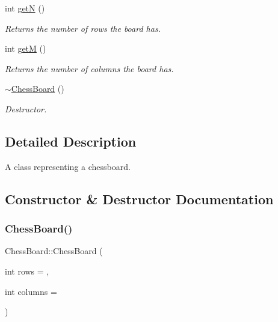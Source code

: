 \begin{DoxyCompactItemize}
$$int \mbox{\hyperlink{classChessBoard_acc60486a0fafa95c85263e15e6b7f6ab}{getN}} ()
\begin{DoxyCompactList}\small\item\em Returns the number of rows the board has. \end{DoxyCompactList}\item 
\mbox{\label{classChessBoard_a490cb74dc406003683738ab23372e66e}} 
int \mbox{\hyperlink{classChessBoard_a490cb74dc406003683738ab23372e66e}{getM}} ()
\begin{DoxyCompactList}\small\item\em Returns the number of columns the board has. \end{DoxyCompactList}\item 
\mbox{\label{classChessBoard_acece8633f444b90d7b371b57f52d0780}} 
\mbox{\hyperlink{classChessBoard_acece8633f444b90d7b371b57f52d0780}{$\sim$\+Chess\+Board}} ()
\begin{DoxyCompactList}\small\item\em Destructor. \end{DoxyCompactList}\end{DoxyCompactItemize}


\subsection{Detailed Description}
A class representing a chessboard. 

\subsection{Constructor \& Destructor Documentation}
\mbox{\label{classChessBoard_a1b745365065a0d4c7593589303ef4d76}} 
\subsubsection{\texorpdfstring{Chess\+Board()}{ChessBoard()}}
{\footnotesize\ttfamily Chess\+Board\+::\+Chess\+Board (\begin{DoxyParamCaption}\item[{int}]{rows = {},  }\item[{int}]{columns = {} }\end{DoxyParamCaption})}



